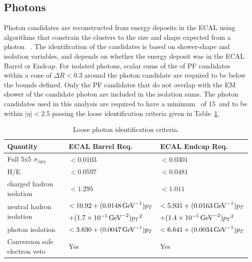 \subsection{Photons}
Photon candidates are reconstructed from energy deposits in the ECAL using algorithms
that constrain the clusters to the size and shape expected from a photon~\cite{CMS:EGM-14-001} .
The identification of the candidates is based on shower-shape and isolation variables, and depends on
whether the energy deposit was in the ECAL Barrel or Endcap.
For isolated photons, scalar sums of the \pt of PF candidates within a cone of $\Delta R < 0.3$
around the photon candidate are required to be below the bounds defined. Only the PF candidates
that do not overlap with the EM shower of the candidate photon are included in the isolation sums.
The photon candidates used in this analysis are required to have a minimum \pt~of 15~\GeV and to  
be within $|\eta| < 2.5$ passing the loose identification criteria given in Table~\ref{tab:PhotonIDLoose}.

\begin{table}[htbp]
  \begin{center}
 {\small
  \begin{tabular} {lll}
\hline
Quantity                                   &  ECAL Barrel Req. & ECAL Endcap Req.  \\
\hline
Full 5x5 $\sigma_{i\eta i\eta}$            & $< 0.0103$ & $< 0.0301$     \\ \hline 
H/E                                        & $< 0.0597$ & $< 0.0481$     \\ \hline 
charged hadron isolation                   & $< 1.295$  & $< 1.011$      \\ \hline 
\multirow{2}{*}{neutral hadron isolation}  & $< 10.92 + (0.0148\,{\mathrm{Ge\kern -0.1em V}}^{-1})p_T$          & $< 5.931 + (0.0163\,{\mathrm{Ge\kern -0.1em V}}^{-1})p_T$        \\  
                                           & $+ (1.7\times 10^{-5}\,{\mathrm{Ge\kern -0.1em V}}^{-2}){p_T}^2$   & $+(1.4\times 10^{-5}\,{\mathrm{Ge\kern -0.1em V}}^{-2}){p_T}^2$  \\ \hline
photon isolation                           & $< 3.630 + (0.0047\,{\mathrm{Ge\kern -0.1em V}}^{-1})p_T$          & $< 6.641 + (0.0034\,{\mathrm{Ge\kern -0.1em V}}^{-1})p_T$        \\ \hline 
Conversion safe electron veto              & Yes & Yes           \\
\hline
\end{tabular}
}
\caption{Loose photon identification criteria.}
\label{tab:PhotonIDLoose}
  \end{center}
\end{table}


